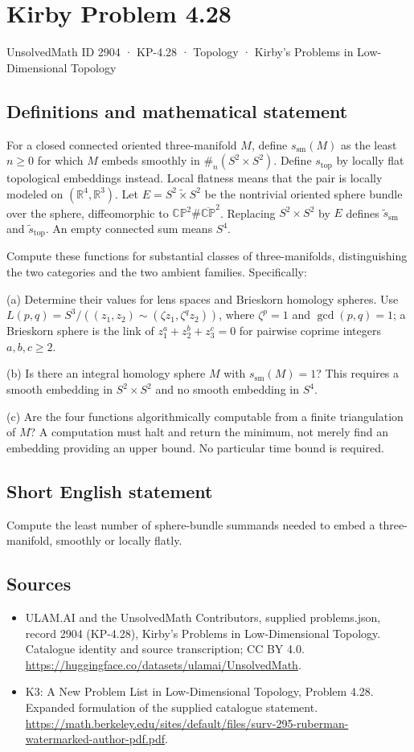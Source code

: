 \documentclass[11pt,a4paper]{article}
\begin{document}
\section*{Kirby Problem 4.28}\label{2904}
{\small UnsolvedMath ID 2904 · KP-4.28 · Topology · Kirby's Problems in Low-Dimensional Topology}
\subsection{Definitions and mathematical statement}
For a closed connected oriented three-manifold $M$, define $s_{\mathrm{sm}}(M)$ as the least $n\ge0$ for which $M$ embeds smoothly in $\#_n(S^2\times S^2)$. Define $s_{\mathrm{top}}$ by locally flat topological embeddings instead. Local flatness means that the pair is locally modeled on $(\mathbb R^4,\mathbb R^3)$. Let $E=S^2\widetilde\times S^2$ be the nontrivial oriented sphere bundle over the sphere, diffeomorphic to $\mathbb{CP}^2\#\overline{\mathbb{CP}}^{2}$. Replacing $S^2\times S^2$ by $E$ defines $\widetilde s_{\mathrm{sm}}$ and $\widetilde s_{\mathrm{top}}$. An empty connected sum means $S^4$.

Compute these functions for substantial classes of three-manifolds, distinguishing the two categories and the two ambient families. Specifically:

(a) Determine their values for lens spaces and Brieskorn homology spheres. Use $L(p,q)=S^3/((z_1,z_2)\sim(\zeta z_1,\zeta^qz_2))$, where $\zeta^p=1$ and $\gcd(p,q)=1$; a Brieskorn sphere is the link of $z_1^a+z_2^b+z_3^c=0$ for pairwise coprime integers $a,b,c\ge2$.

(b) Is there an integral homology sphere $M$ with $s_{\mathrm{sm}}(M)=1$? This requires a smooth embedding in $S^2\times S^2$ and no smooth embedding in $S^4$.

(c) Are the four functions algorithmically computable from a finite triangulation of $M$? A computation must halt and return the minimum, not merely find an embedding providing an upper bound. No particular time bound is required.
\subsection{Short English statement}
Compute the least number of sphere-bundle summands needed to embed a three-manifold, smoothly or locally flatly.
\subsection{Sources}
\begin{itemize}
\item[S1] ULAM.AI and the UnsolvedMath Contributors, supplied problems.json, record 2904 (KP-4.28), Kirby's Problems in Low-Dimensional Topology. Catalogue identity and source transcription; CC BY 4.0.
\url{https://huggingface.co/datasets/ulamai/UnsolvedMath}.
\item[S2] K3: A New Problem List in Low-Dimensional Topology, Problem 4.28. Expanded formulation of the supplied catalogue statement.
\url{https://math.berkeley.edu/sites/default/files/surv-295-ruberman-watermarked-author-pdf.pdf}.
\end{itemize}
\end{document}
